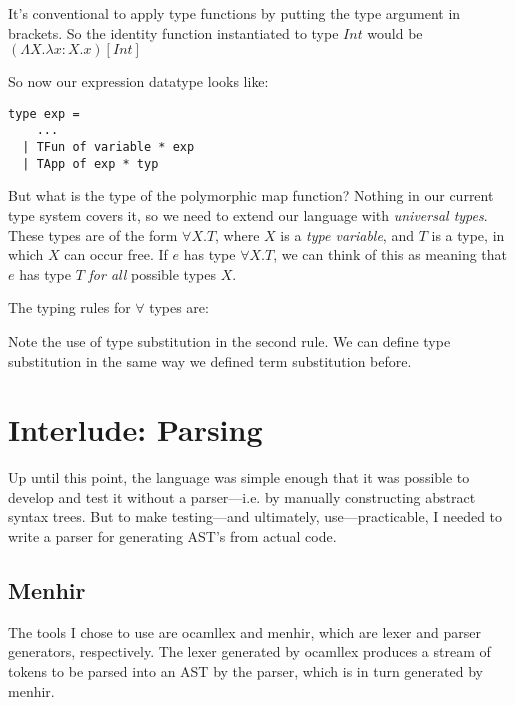 \documentclass[pageno]{jpaper}
\begin{document}
{It's conventional to apply type functions by putting the type argument in brackets.  So the identity function
instantiated to type $Int$ would be $(\Lambda X.\lambda x:X.x) [Int]$

So now our expression datatype looks like:

\begin{lstlisting}
type exp =
    ...
  | TFun of variable * exp
  | TApp of exp * typ
\end{lstlisting}

But what is the type of the polymorphic map function? Nothing in our current type system covers it, so we need to
extend our language with \textit{universal types}. These types are of the form $\forall X. T$, where
$X$ is a \textit{type variable}, and $T$ is a type, in which $X$ can occur free.  If $e$
has type $\forall X.T$, we can think of this as meaning that $e$ has type $T$ \textit{for all} possible
types $X$.

The typing rules for $\forall$ types are:

\begin{prooftree}
\end{prooftree}

\begin{prooftree}
\end{prooftree}

Note the use of type substitution in the second rule. We can define type substitution in
the same way we defined term substitution before.

\section{Interlude: Parsing}

Up until this point, the language was simple enough that it was possible to develop and test it  without a parser---i.e. by manually constructing abstract syntax trees. But to make testing---and ultimately, use---practicable, I needed to write a parser for generating AST's from actual code.

\subsection{Menhir}

The tools I chose to use
are ocamllex and menhir, which are lexer and parser generators, respectively.
The lexer generated by ocamllex produces a stream of tokens to be parsed into an AST by the parser, which is
in turn generated by menhir.

}
\end{document}
